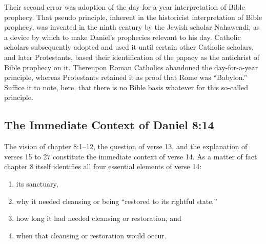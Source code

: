 Their second error was adoption of the day-for-a-year interpretation of
Bible prophecy. That pseudo principle, inherent in the historicist
interpretation of Bible prophecy, was invented in the ninth century by the
Jewish scholar Nahawendi, as a device by which to make Daniel's prophecies
relevant to his day. Catholic scholars subsequently adopted and used it
until certain other Catholic scholars, and later Protestants, based
their identification of the papacy as the antichrist of Bible prophecy on
it. Thereupon Roman Catholics abandoned the day-for-a-year principle,
whereas Protestants retained it as proof that Rome was ``Babylon.'' Suffice it
to note, here, that there is no Bible basis whatever for this so-called
principle.

\subsection{The Immediate Context of Daniel 8:14}

The vision of chapter 8:1--12, the question of verse 13, and the explanation
of verses 15 to 27 constitute the immediate context of verse 14. As a matter
of fact chapter 8 itself identifies all four essential elements of verse 14:
\begin{enumerate}
	\item its sanctuary, 
	\item why it needed cleansing or being ``restored to its
rightful state,'' 
	\item how long it had needed cleansing or restoration, and
	\item when that cleansing or restoration would occur.
\end{enumerate}

